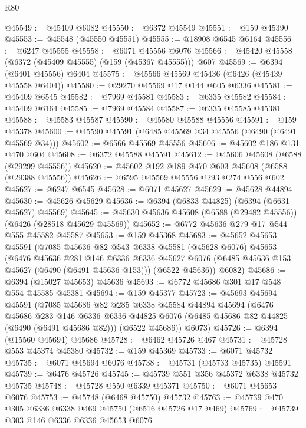 \begin{lexlean}{R80}
\begin{coremodule}
@45549 := @45409 @6082
@45550 := @6372 @45549
@45551 := @159 @45390
@45553 := @45548 (@45550 @45551)
@45555 := @18908 @6545 @6164
@45556 := @6247 @45555
@45558 := @6071 @45556 @6076
@45566 := @45420 @45558 (@6372 (@45409 @45555) (@159 (@45367 @45555))) @607
@45569 := @6394 (@6401 @45556) @6404
@45575 := @45566 @45569 @45436 (@6426 (@45439 @45558 @6404))
@45580 := @29270 @45569 @17 @144 @605 @6336
@45581 := @45409 @6545
@45582 := @7969 @45581
@45583 := @6335 @45582
@45584 := @45409 @6164
@45585 := @7969 @45584
@45587 := @6335 @45585 @45381
@45588 := @45583 @45587
@45590 := @45580 @45588 @45556
@45591 := @159 @45378
@45600 := @45590 @45591 (@6485 @45569 @34 @45556 (@6490 (@6491 @45569 @34)))
@45602 := @6566 @45569 @45556
@45606 := @45602 @186 @131 @470 @604
@45608 := @6372 @45588 @45591
@45612 := @45606 @45608 (@6588 (@29299 @45556))
@45620 := @45602 @192 @189 @470 @603 @45608 (@6588 (@29388 @45556))
@45626 := @6595 @45569 @45556 @293 @274 @556 @602
@45627 := @6247 @6545
@45628 := @6071 @45627
@45629 := @45628 @44894
@45630 := @45626 @45629
@45636 := @6394 (@6833 @44825) (@6394 (@6631 @45627) @45569)
@45645 := @45630 @45636 @45608 (@6588 (@29482 @45556)) (@6426 (@28518 @45629 @45569))
@45652 := @6772 @45636 @279 @17 @544 @555 @45582 @45587
@45653 := @159 @45368
@45683 := @45652
    @45653
    @45591
    (@7085
      @45636
      @82
      @543
      @6338
      @45581
      (@45628 @6076)
      @45653
      (@6476
        @45636
        @281
        @146
        @6336
        @6336
        @45627
        @6076
        (@6485 @45636 @153 @45627 (@6490 (@6491 @45636 @153)))
        (@6522 @45636))
      @6082)
@45686 := @6394 (@15027 @45653) @45636
@45693 := @6772 @45686 @301 @17 @548 @554 @45585 @45381
@45694 := @159 @45377
@45723 := @45693
    @45694
    @45591
    (@7085
      @45686
      @82
      @285
      @6338
      @45584
      @44894
      @45694
      (@6476
        @45686
        @283
        @146
        @6336
        @6336
        @44825
        @6076
        (@6485 @45686 @82 @44825 (@6490 (@6491 @45686 @82)))
        (@6522 @45686))
      @6073)
@45726 := @6394 (@15560 @45694) @45686
@45728 := @6462 @45726 @467
@45731 := @45728 @553 @45374 @45380
@45732 := @159 @45369
@45733 := @6071 @45732
@45735 := @6071 @45694 @6076
@45738 := @45731 (@45733 @45735) @45591
@45739 := @6476 @45726
@45745 := @45739 @551 @356 @45372 @6338 @45732 @45735
@45748 := @45728 @550 @6339 @45371
@45750 := @6071 @45653 @6076
@45753 := @45748 (@6468 @45750) @45732
@45763 := @45739 @470 @305 @6336 @6338 @469 @45750 (@6516 @45726 @17 @469)
@45769 := @45739 @303 @146 @6336 @6336 @45653 @6076

\end{coremodule}
\end{lexlean}
